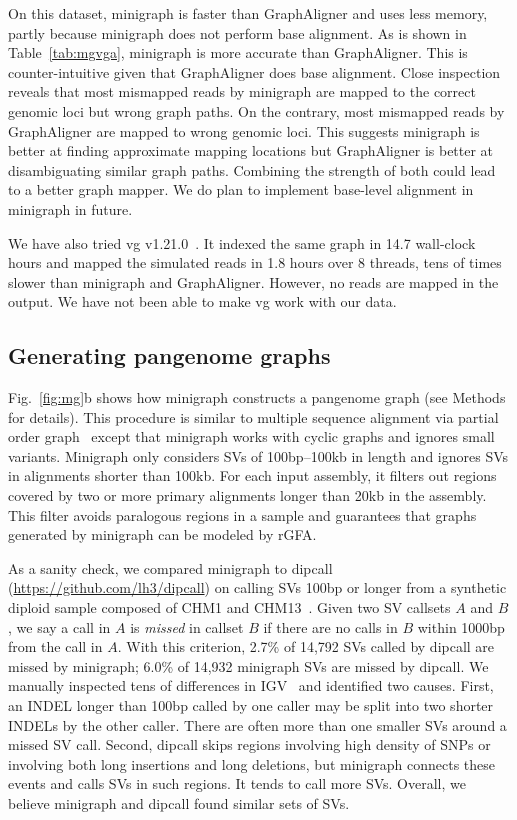 \documentclass[twocolumn]{bmcart}
\begin{document}
On this dataset, minigraph
is faster than GraphAligner and uses less memory, partly because minigraph does
not perform base alignment.
As is shown in Table~\ref{tab:mgvga}, minigraph is more accurate than
GraphAligner. This is counter-intuitive given that GraphAligner does base
alignment. Close inspection reveals that most mismapped reads by minigraph are
mapped to the correct genomic loci but wrong graph paths. On the contrary, most
mismapped reads by GraphAligner are mapped to wrong genomic loci. This suggests
minigraph is better at finding approximate mapping locations but GraphAligner
is better at disambiguating similar graph paths.  Combining the strength of
both could lead to a better graph mapper. We do plan to implement base-level
alignment in minigraph in future.

We have also tried vg v1.21.0~\cite{Garrison:2018aa}. It indexed the same graph in 14.7 wall-clock
hours and mapped the simulated reads in 1.8 hours over 8 threads, tens of times
slower than minigraph and GraphAligner. However, no reads are mapped in the
output. We have not been able to make vg work with our data.

\subsection*{Generating pangenome graphs}

Fig.~\ref{fig:mg}b shows how minigraph constructs a pangenome graph (see
Methods for details). This procedure is similar to multiple sequence alignment
via partial order graph~\cite{Lee_2002} except that minigraph works with cyclic
graphs and ignores small variants. Minigraph only considers SVs of
100bp--100kb in length and ignores SVs in alignments shorter than 100kb.
For each input assembly, it filters out regions covered by two or more primary
alignments longer than 20kb in the assembly. This filter avoids paralogous
regions in a sample and guarantees that graphs generated by minigraph can be
modeled by rGFA.

As a sanity check, we compared minigraph to dipcall
(\href{https://github.com/lh3/dipcall}{https://github.com/lh3/dipcall}) on
calling SVs 100bp or longer from a synthetic diploid sample composed of CHM1
and CHM13~\cite{Li:2018aa}. Given two SV callsets $A$ and $B$, we say a call in
$A$ is \emph{missed} in callset $B$ if there are no calls in $B$ within 1000bp
from the call in $A$. With this criterion, 2.7\% of 14,792 SVs called by
dipcall are missed by minigraph; 6.0\% of 14,932 minigraph SVs are missed by
dipcall. We manually inspected tens of differences in
IGV~\cite{Robinson:2011aa} and identified two causes. First, an INDEL longer
than 100bp called by one caller may be split into two shorter INDELs by the
other caller. There are often more than one smaller SVs around a missed SV
call. Second, dipcall skips regions involving high density of SNPs or involving
both long insertions and long deletions, but minigraph connects these events
and calls SVs in such regions. It tends to call more SVs. Overall, we believe
minigraph and dipcall found similar sets of SVs.
\end{document}
